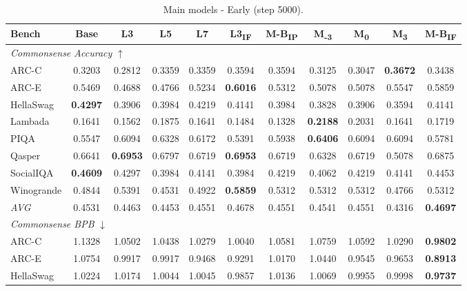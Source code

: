 \begin{table}[htbp]
\centering
\setlength{\tabcolsep}{2.5pt}
\caption{Main models - Early (step 5000).}
\label{tab:main_early}
\begin{tabular}{lcccccccccc}
\toprule
Bench & Base & L3 & L5 & L7 & L3\textsubscript{IF} & M-B\textsubscript{IP} & M\textsubscript{-3} & M\textsubscript{0} & M\textsubscript{3} & M-B\textsubscript{IF} \\
\midrule
\multicolumn{11}{l}{\textit{Commonsense Accuracy} $\uparrow$} \\
ARC-C & 0.3203 & 0.2812 & 0.3359 & 0.3359 & 0.3594 & 0.3594 & 0.3125 & 0.3047 & \textbf{0.3672} & 0.3438 \\
ARC-E & 0.5469 & 0.4688 & 0.4766 & 0.5234 & \textbf{0.6016} & 0.5312 & 0.5078 & 0.5078 & 0.5547 & 0.5859 \\
HellaSwag & \textbf{0.4297} & 0.3906 & 0.3984 & 0.4219 & 0.4141 & 0.3984 & 0.3828 & 0.3906 & 0.3594 & 0.4141 \\
Lambada & 0.1641 & 0.1562 & 0.1875 & 0.1641 & 0.1484 & 0.1328 & \textbf{0.2188} & 0.2031 & 0.1641 & 0.1719 \\
PIQA & 0.5547 & 0.6094 & 0.6328 & 0.6172 & 0.5391 & 0.5938 & \textbf{0.6406} & 0.6094 & 0.6094 & 0.5781 \\
Qasper & 0.6641 & \textbf{0.6953} & 0.6797 & 0.6719 & \textbf{0.6953} & 0.6719 & 0.6328 & 0.6719 & 0.5078 & 0.6875 \\
SocialIQA & \textbf{0.4609} & 0.4297 & 0.3984 & 0.4141 & 0.3984 & 0.4219 & 0.4062 & 0.4219 & 0.4141 & 0.4453 \\
Winogrande & 0.4844 & 0.5391 & 0.4531 & 0.4922 & \textbf{0.5859} & 0.5312 & 0.5312 & 0.5312 & 0.4766 & 0.5312 \\
\textit{AVG} & 0.4531 & 0.4463 & 0.4453 & 0.4551 & 0.4678 & 0.4551 & 0.4541 & 0.4551 & 0.4316 & \textbf{0.4697} \\
\midrule
\multicolumn{11}{l}{\textit{Commonsense BPB} $\downarrow$} \\
ARC-C & 1.1328 & 1.0502 & 1.0438 & 1.0279 & 1.0040 & 1.0581 & 1.0759 & 1.0592 & 1.0290 & \textbf{0.9802} \\
ARC-E & 1.0754 & 0.9917 & 0.9917 & 0.9468 & 0.9291 & 1.0170 & 1.0440 & 0.9545 & 0.9653 & \textbf{0.8913} \\
HellaSwag & 1.0224 & 1.0174 & 1.0044 & 1.0045 & 0.9857 & 1.0136 & 1.0069 & 0.9955 & 0.9998 & \textbf{0.9737} \\

\end{tabular}
\end{table}
